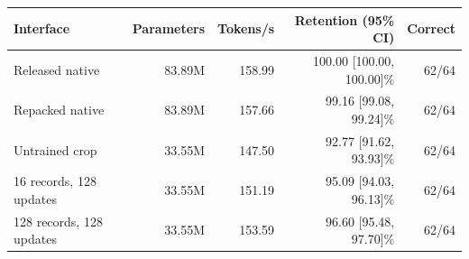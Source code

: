 \begin{tabular}{lrrrr}
\toprule
Interface & Parameters & Tokens/s & Retention (95\% CI) & Correct \\
\midrule
Released native & 83.89M & 158.99 & 100.00 [100.00, 100.00]\% & 62/64 \\
Repacked native & 83.89M & 157.66 & 99.16 [99.08, 99.24]\% & 62/64 \\
Untrained crop & 33.55M & 147.50 & 92.77 [91.62, 93.93]\% & 62/64 \\
16 records, 128 updates & 33.55M & 151.19 & 95.09 [94.03, 96.13]\% & 62/64 \\
128 records, 128 updates & 33.55M & 153.59 & 96.60 [95.48, 97.70]\% & 62/64 \\
\bottomrule
\end{tabular}
